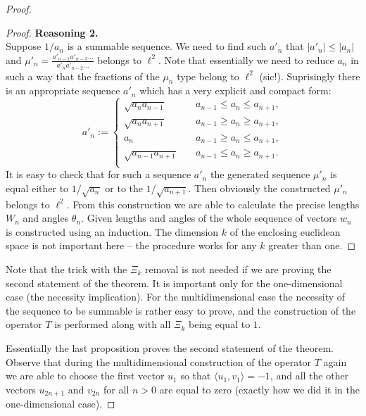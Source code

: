 \begin{proof}
\begin{proof}
      \textbf{Reasoning 2.}\\
      Suppose $1/a_n$ is a summable sequence.
      We need to find such $a'_n$ that $|a'_n| \leq |a_n|$ and $\mu'_n = \frac{a'_{n-1} a'_{n-3} \dots}{a'_{n} a'_{n-2} \dots }$ belongs to $\ell^2$.
      Note that essentially we need to reduce $a_n$ in such a way that the fractions of the $\mu_n$ type belong to $\ell^2$ (sic!).
      Suprisingly there is an appropriate sequence $a'_n$ which has a very explicit and compact form:
      \begin{equation*}
        a'_n := \begin{cases}
          \sqrt{a_n a_{n-1}} & \quad a_{n-1} \leq a_n \leq a_{n+1},\\
          \sqrt{a_n a_{n+1}} & \quad a_{n-1} \geq a_n \geq a_{n+1},\\
          a_n & \quad a_{n-1} \geq a_n \leq a_{n+1},\\
          \sqrt{a_{n-1} a_{n+1}} &\quad a_{n-1} \leq a_n \geq a_{n+1}.\\
        \end{cases}
      \end{equation*}
      It is easy to check that for such a sequence $a'_n$ the generated sequence $\mu'_n$ is equal either to $1/\sqrt{a_n}$ or to the $1/\sqrt{a_{n+1}}$.
      Then obviously the constructed $\mu'_n$ belongs to $\ell^2$.
      From this construction we are able to calculate the precise lengths $W_n$ and angles $\theta_n$.
      Given lengths and angles of the whole sequence of vectors $w_n$ is constructed using an induction.
      The dimension $k$ of the enclosing euclidean space is not important here -- the procedure works for any $k$ greater than one.
    \end{proof}
    \begin{remark}
      Note that the trick with the $\Xi_k$ removal is not needed if we are proving the second statement of the theorem.
      It is important only for the one-dimensional case (the necessity implication).
      For the multidimensional case the necessity of
      the sequence to be summable is rather easy to prove, and the construction of the operator $T$ is
      performed along with all $\Xi_k$ being equal to $1$.
    \end{remark}
    Essentially the last proposition proves the second statement of the theorem.
    Observe that during the multidimensional construction of the operator $T$ again
      we are able to choose the first vector $u_1$ so that $\langle u_1,v_1 \rangle = -1$,
      and all the other vectors $u_{2n+1}$ and $v_{2n}$ for all $n>0$ are equal to zero (exactly how we did it in the one-dimensional case).
  \end{proof}
